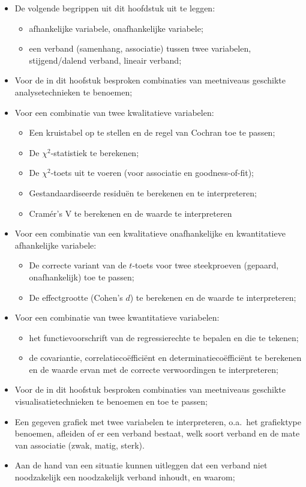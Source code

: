 \begin{itemize}
  \item De volgende begrippen uit dit hoofdstuk uit te leggen:
  \begin{itemize}
    \item afhankelijke variabele, onafhankelijke variabele;
    \item een verband (samenhang, associatie) tussen twee variabelen, stijgend/dalend verband, lineair verband;
  \end{itemize}
  \item Voor de in dit hoofstuk besproken combinaties van meetniveaus geschikte analysetechnieken te benoemen;
  \item Voor een combinatie van twee kwalitatieve variabelen:
  \begin{itemize}
    \item Een kruistabel op te stellen en de regel van Cochran toe te passen;
    \item De $\chi^2$-statistiek te berekenen;
    \item De $\chi^2$-toets uit te voeren (voor associatie en goodness-of-fit);
    \item Gestandaardiseerde residuën te berekenen en te interpreteren;
    \item Cramér's V te berekenen en de waarde te interpreteren
  \end{itemize}
  \item Voor een combinatie van een kwalitatieve onafhankelijke en kwantitatieve afhankelijke variabele:
  \begin{itemize}
    \item De correcte variant van de $t$-toets voor twee steekproeven (gepaard, onafhankelijk) toe te passen;
    \item De effectgrootte (Cohen's $d$) te berekenen en de waarde te interpreteren;
  \end{itemize}
  \item Voor een combinatie van twee kwantitatieve variabelen:
  \begin{itemize}
    \item het functievoorschrift van de regressierechte te bepalen en die te tekenen;
    \item de covariantie, correlatiecoëfficiënt en determinatiecoëfficiënt te berekenen en de waarde ervan met de correcte verwoordingen te interpreteren;
  \end{itemize}
  \item Voor de in dit hoofstuk besproken combinaties van meetniveaus geschikte visualisatietechnieken te benoemen en toe te passen;
  \item Een gegeven grafiek met twee variabelen te interpreteren, o.a.~het grafiektype benoemen, afleiden of er een verband bestaat, welk soort verband en de mate van associatie (zwak, matig, sterk).
  \item Aan de hand van een situatie kunnen uitleggen dat een verband niet noodzakelijk een noodzakelijk verband inhoudt, en waarom;
\end{itemize}

